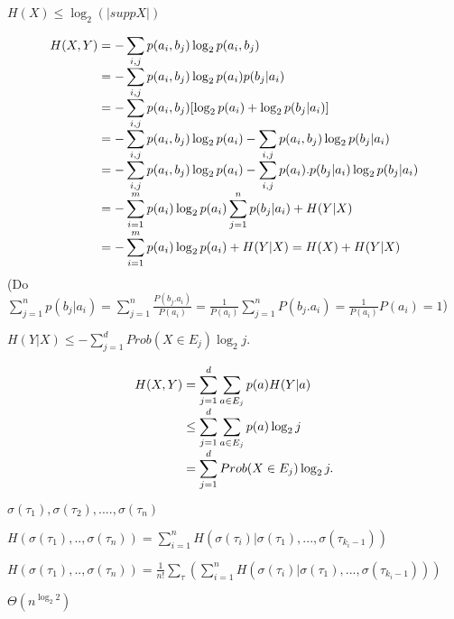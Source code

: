 \documentclass[a4paper]{report}
\begin{document}
$H(X) \leq \log_{2}(|supp X|)$

\begin{equation*}
\begin{array}{l@{}l}
H(X,Y)
	&{}= \displaystyle -\sum_{i,j}p(a_{i},b_{j})\log_{2} p(a_{i},b_{j}) \\
	&{}= \displaystyle -\sum_{i,j}p(a_{i},b_{j})\log_{2} p(a_{i})p(b_{j}|a_{i}) \\ 
	&{}= \displaystyle -\sum_{i,j}p(a_{i},b_{j})[\log_{2}p(a_{i}) + \log_{2}p(b_{j}|a_{i}) ] \\
	&{}= \displaystyle -\sum_{i,j}p(a_{i},b_{j})\log_{2}p(a_{i})  \displaystyle -\sum_{i,j}p(a_{i},b_{j})\log_{2}p(b_{j}|a_{i}) \\
	&{}= \displaystyle -\sum_{i,j}p(a_{i},b_{j})\log_{2}p(a_{i}) \displaystyle -\sum_{i,j}p(a_{i}).p(b_{j}|a_{i})\log_{2}p(b_{j}|a_{i}) \\
	&{}= \displaystyle -\sum_{i=1}^{m}p(a_{i}) \log_{2}p(a_{i}) \displaystyle \sum_{j=1}^{n}p(b_{j}|a_{i}) + H(Y|X) \\
	&{}= \displaystyle -\sum_{i=1}^{m}p(a_{i}) \log_{2}p(a_{i}) + H(Y|X) = H(X) + H(Y|X) 
\end{array}
\end{equation*}
(Do $\displaystyle \sum_{j=1}^{n}p(b_{j}|a_{i}) = \displaystyle \sum_{j=1}^{n}\frac{P(b_{j}.a_{i})}{P(a_{i})} = \frac{1}{P(a_{i})}\displaystyle \sum_{j=1}^{n}P(b_{j}.a_{i})=\frac{1}{P(a_{i})}P(a_{i}) =1  $)


$H(Y|X) \leq \displaystyle -\sum_{j=1}^{d}Prob(X \in E_{j})\log_{2}j.$ 


\begin{equation}
\begin{array}{l@{}l}
H(X,Y)
	&{}= \displaystyle \sum _{j=1}^{d}\sum_{a \in E_{j}}p(a)H(Y|a) \\
	&{} \leq \displaystyle \sum _{j=1}^{d}\sum_{a \in E_{j}}p(a)\log_{2}j \\
	&{} = \displaystyle \sum_{j=1}^{d}Prob(X \in E_{j})\log_{2}j.
\end{array}
\end{equation}


$\sigma (\tau_{1}), \sigma (\tau_{2}), .... , \sigma (\tau_{n})$

$H(\sigma (\tau_{1}),..,\sigma (\tau_{n})) = \displaystyle \sum_{i=1}^{n}H(\sigma (\tau_{i})| \sigma (\tau_{1}),...,\sigma (\tau_{k_{i}-1}))$

$H(\sigma (\tau_{1}),..,\sigma (\tau_{n})) = \frac{1}{n!}\displaystyle \sum _{\tau}\left ( \displaystyle \sum_{i=1}^{n}H(\sigma (\tau_{i})| \sigma (\tau_{1}),...,\sigma (\tau_{k_{i}-1})) \right )$

$\Theta(n^{\log_2 2} )$
\end{document}
